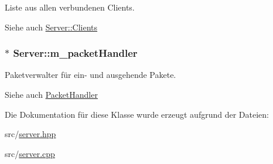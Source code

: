 Liste aus allen verbundenen Clients. 

\begin{DoxySeeAlso}{Siehe auch}
\hyperlink{class_server_a2642184a6bcfa2be2b0670e27dcf1e18}{Server\+::\+Clients} 
\end{DoxySeeAlso}
\hypertarget{class_server_a1f34d45e9f5cae0325e2b5ecc80bc2b5}{}
\subsubsection[{m\+\_\+packet\+Handler}]{$\ast$ Server\+::m\+\_\+packet\+Handler\hspace{0.3cm}{\ttfamily [protected]}}\label{class_server_a1f34d45e9f5cae0325e2b5ecc80bc2b5}


Paketverwalter für ein-\/ und ausgehende Pakete. 

\begin{DoxySeeAlso}{Siehe auch}
\hyperlink{class_packet_handler}{Packet\+Handler} 
\end{DoxySeeAlso}


Die Dokumentation für diese Klasse wurde erzeugt aufgrund der Dateien\+:\begin{DoxyCompactItemize}
\item 
src/\hyperlink{server_8hpp}{server.\+hpp}\item 
src/\hyperlink{server_8cpp}{server.\+cpp}\end{DoxyCompactItemize}
